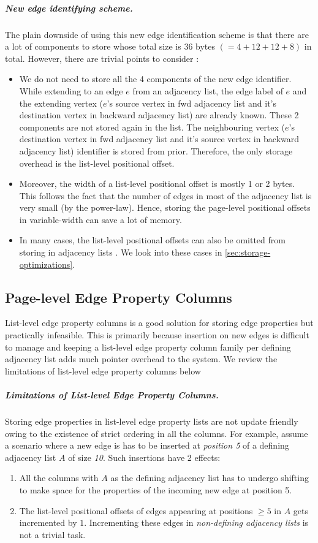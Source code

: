 \vspace{-12pt}
\subparagraph{New edge identifying scheme.} The plain downside of using this new edge identification scheme is that there are a lot of components to store whose total size is 36 bytes $(=4+12+12+8)$ in total. However, there are trivial points to consider : 
\begin{itemize}
	\item We do not need to store all the 4 components of the new edge identifier. While extending to an edge $e$ from an adjacency list, the edge label of $e$ and the extending vertex ($e$'s source vertex in \gls{fwd} adjacency list and it's destination vertex in backward adjacency list) are already known. These 2 components are not stored again in the list. The neighbouring vertex ($e$'s destination vertex in \gls{fwd} adjacency list and it's source vertex in backward adjacency list) identifier is stored from prior. Therefore, the only storage overhead is the list-level positional offset.
	\item Moreover, the width of a list-level positional offset is mostly 1 or 2 bytes. This follows the fact that the number of edges in most of the adjacency list is very small (by the power-law). Hence, storing the page-level positional offsets in variable-width can save a lot of memory.
	\item In many cases, the list-level positional offsets can also be omitted from storing in adjacency lists . We look into these cases in \ref{sec:storage-optimizations}.
\end{itemize}

\subsection{Page-level Edge Property Columns}
\label{sec:page-level-edge-property-columns}

List-level edge property columns is a good solution for storing edge properties but practically infeasible. This is primarily because insertion on new edges is difficult to manage and keeping a list-level edge property column family per defining adjacency list adds much pointer overhead to the system. We review the limitations of list-level edge property columns below


\vspace{-12pt}
\subparagraph{Limitations of List-level Edge Property Columns.}
Storing edge properties in list-level edge property lists are not update friendly owing to the existence of strict ordering in all the columns. For example, assume a scenario where a new edge is has to be inserted at \emph{position 5} of a defining adjacency list $A$ of size \emph{10}. Such insertions have 2 effects: 
\begin{enumerate}
	\item All the columns with $A$ as the defining adjacency list has to undergo shifting to make space for the properties of the incoming new edge at position 5.
	\item The list-level positional offsets of edges appearing at positions $\geq 5$ in $A$ gets incremented by $1$. Incrementing these edges in \emph{non-defining adjacency lists} is not a trivial task.  
\end{enumerate}

